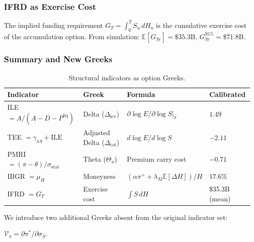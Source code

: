 \subsubsection{IFRD as Exercise Cost}

\begin{proposition}\label{prop:ifrd_strike}
  The implied funding requirement $G_T = \int_0^T S_u\,dH_u$ is the
  cumulative exercise cost of the accumulation option.  From simulation:
  $\mathbb{E}[G_{3\mathrm{y}}] = \$35.3$B, $G_{3\mathrm{y}}^{95\%} = \$71.8$B.
\end{proposition}

\subsubsection{Summary and New Greeks}

\begin{table}[H]
\centering
\caption{Structural indicators as option Greeks.}
\label{tab:greek-map}
\begin{tabular}{@{}llll@{}}
\toprule
\textbf{Indicator} & \textbf{Greek} & \textbf{Formula} & \textbf{Calibrated} \\
\midrule
ILE $= A/(A-D-P^{\mathrm{liq}})$ & Delta ($\Delta_{\mathrm{lev}}$)
  & $\partial\log E / \partial\log S\big|_\pi$
  & $1.49$ \\[4pt]
TEE $= \gamma_{\pi S} + \text{ILE}$ & Adjusted Delta ($\Delta_{\mathrm{tot}}$)
  & $d\log E / d\log S$
  & $-2.11$ \\[4pt]
PMRI $= (\pi-\theta)/\sigma_{\mathrm{stat}}$ & Theta ($\Theta_\pi$)
  & Premium carry cost
  & $-0.71$ \\[4pt]
IBGR $= \mu_H$ & Moneyness
  & $(\alpha\pi^+ + \lambda_M\mathbb{E}[\Delta H])/H$
  & $17.6\%$ \\[4pt]
IFRD $= G_T$ & Exercise cost
  & $\int S\,dH$
  & \$35.3B (mean) \\
\bottomrule
\end{tabular}
\end{table}

We introduce two additional Greeks absent from the original indicator set:

\begin{definition}
  $\mathcal{V}_\pi = \partial\pi^*/\partial\sigma_S$.
\end{definition}


